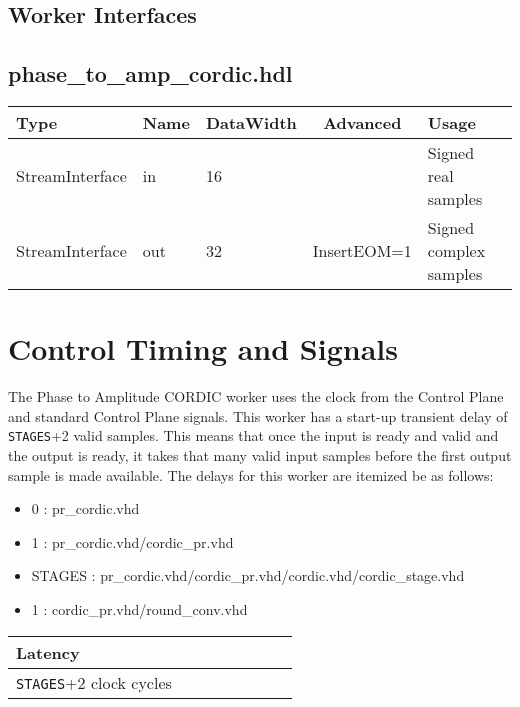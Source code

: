 \documentclass{article}
\def\comp{phase\_to\_amp\_cordic}
\begin{document}
\begin{landscape}
\section*{Worker Interfaces}
\subsection*{\comp.hdl}
\begin{scriptsize}
	\begin{tabular}{|M{2cm}|M{1.5cm}|M{4cm}|c|M{10cm}|}
		\hline
		Type            & Name & DataWidth & Advanced                & Usage                  \\
		\hline
		StreamInterface & in   & 16        & & Signed real samples    \\
		\hline
		StreamInterface & out  & 32        & InsertEOM=1 & Signed complex samples \\
		\hline
	\end{tabular}
\end{scriptsize}
\end{landscape}

\section*{Control Timing and Signals}
The Phase to Amplitude CORDIC worker uses the clock from the Control Plane and standard Control Plane signals. This worker has a start-up transient delay of \verb+STAGES++2 valid samples. This means that once the input is ready and valid and the output is ready, it takes that many valid input samples before the first output sample is made available. The delays for this worker are itemized be as follows:
\begin{itemize}
	\item 0 : pr\_cordic.vhd
	\item 1 : pr\_cordic.vhd/cordic\_pr.vhd
	\item STAGES : pr\_cordic.vhd/cordic\_pr.vhd/cordic.vhd/cordic\_stage.vhd 
	\item 1 : cordic\_pr.vhd/round\_conv.vhd
\end{itemize}

\begin{tabular}{|M{4.5cm}|M{1cm}|M{1cm}|M{1.5cm}|M{2cm}|M{1cm}|M{1cm}|M{2.5cm}|}
	\hline
	Latency                      \\
	\hline
	\verb+STAGES++2 clock cycles \\
	\hline
\end{tabular}
\end{document}
